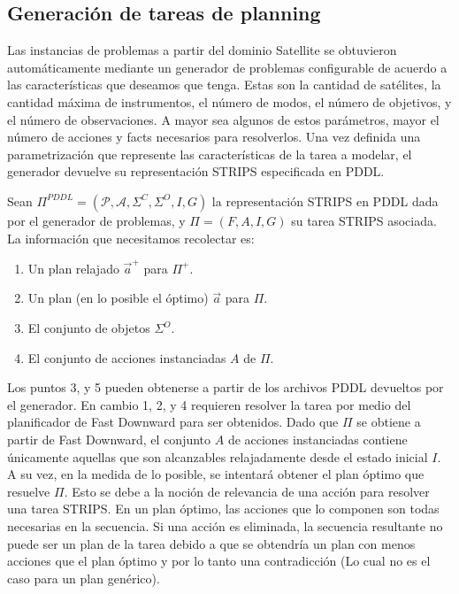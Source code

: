 \subsection{Generación de tareas de planning}
\label{method:data_generation}

Las instancias de problemas a partir del dominio Satellite se obtuvieron
automáticamente mediante un generador de problemas configurable de acuerdo a las
características que deseamos que tenga. Estas son la cantidad de satélites, la
cantidad máxima de instrumentos, el número de modos, el número de objetivos, y
el número de observaciones. A mayor sea algunos de estos parámetros, mayor el
número de acciones y facts necesarios para resolverlos. Una vez definida una
parametrización que represente las características de la tarea a modelar, el
generador devuelve su representación STRIPS especificada en PDDL.


Sean $\Pi^{PDDL} = (\mathcal{P}, \mathcal{A}, \Sigma^{C}, \Sigma^{O}, I, G)$ la
representación STRIPS en PDDL dada por el generador de problemas, y $\Pi = (F,
A, I, G)$ su tarea STRIPS asociada. La información que necesitamos recolectar
es:

\begin{enumerate}
    \item Un plan relajado $\vec{a}^{+}$ para $\Pi^{+}$.
    \item Un plan (en lo posible el óptimo) $\vec{a}$ para $\Pi$.
    \item El conjunto de objetos $\Sigma^{O}$.
    \item El conjunto de acciones instanciadas $A$ de $\Pi$.
\end{enumerate}

Los puntos 3, y 5 pueden obtenerse a partir de los archivos PDDL devueltos por
el generador. En cambio 1, 2, y 4 requieren resolver la tarea por medio del
planificador de Fast Downward para ser obtenidos. Dado que $\Pi$ se obtiene a
partir de Fast Downward, el conjunto $A$ de acciones instanciadas contiene
únicamente aquellas que son alcanzables relajadamente desde el estado inicial
$I$. A su vez, en la medida de lo posible, se intentará obtener el plan óptimo
que resuelve $\Pi$. Esto se debe a la noción de relevancia de una acción para
resolver una tarea STRIPS. En un plan óptimo, las acciones que lo componen son
todas necesarias en la secuencia. Si una acción es eliminada, la secuencia
resultante no puede ser un plan de la tarea debido a que se obtendría un plan
con menos acciones que el plan óptimo y por lo tanto una contradicción (Lo cual
no es el caso para un plan genérico).

